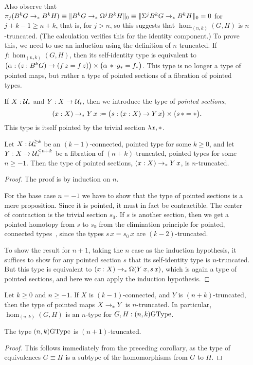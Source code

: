 Also observe that $\pi_j(B^kG \to_\pt B^kH) \equiv
\trunc{0}{B^kG \to_\pt \Omega^jB^kH} \equiv
\trunc{0}{\Sigma^jB^kG \to_\pt B^kH} = 0$ for $j+k-1 \ge n+k$,
that is, for $j>n$, so
this suggests that $\hom_{(n,k)}(G,H)$ is $n$-truncated.
(The calculation verifies this for the identity component.)
To prove
this, we need to use an induction using the definition of
$n$-truncated. If $f:\hom_{(n,k)}(G,H)$, then its self-identity type is
equivalent to $\bigl(\alpha : (z : B^kG) \to (f\,z = f\,z)\bigr) \times
\bigl(\alpha\,\pt \cdot g_\pt = f_\pt\bigr)$. This type is no longer a
type of pointed maps, but rather a type of pointed sections of a
fibration of pointed types.
\begin{defn}
  If $X : \UU_\pt$ and $Y : X \to \UU_\pt$, then we introduce the
  type of \emph{pointed sections},
  \[
    (x : X) \to_\pt Y\,x
    := \bigl(s : (x : X) \to Y\,x\bigr)
    \times \bigl(s\,\pt = \pt\bigr).
  \]
  This type is itself pointed by the trivial section $\lambda x, \pt$.
\end{defn}
\begin{thm}
  Let $X : \UU_\pt^{\ge k}$ be an $(k-1)$-connected, pointed type for
  some $k\ge0$, and
  let $Y : X \to \UU_\pt^{\le n+k}$ be a fibration of
  $(n+k)$-truncated, pointed types for some $n\ge -1$. Then the type
  of pointed sections, $(x : X) \to_\pt Y\,x$, is $n$-truncated.
\end{thm}
\begin{proof}
  The proof is by induction on $n$.

  For the base case $n=-1$ we have to show that the type of pointed
  sections is a mere proposition. Since it is pointed, it must in fact
  be contractible. The center of contraction is the trivial section $s_0$.
  If $s$ is another section, then we get a pointed homotopy from $s$
  to $s_0$ from the elimination principle for pointed, connected
  types~\cite[Lemma~7.5.7]{TheBook}, since the types $s\,x=s_0\,x$ are
  $(k-2)$-truncated.

  To show the result for $n+1$, taking the $n$ case as the induction
  hypothesis, it suffices to show for any pointed section $s$ that its
  self-identity type is $n$-truncated. But this type is equivalent to
  $(x : X) \to_\pt \Omega(Y\,x, s\,x)$, which is again a type of
  pointed sections, and here we can apply the induction hypothesis.
\end{proof}
\begin{cor}
  Let $k\ge0$ and $n\ge-1$. If $X$ is $(k-1)$-connected, and $Y$ is
  $(n+k)$-truncated, then the type of pointed maps $X \to_\pt Y$ is
  $n$-truncated. In particular, $\hom_{(n,k)}(G,H)$ is an $n$-type for
  $G,H:(n,k)\GType$.
\end{cor}
\begin{cor}
  The type $(n,k)\GType$ is $(n+1)$-truncated.
\end{cor}
\begin{proof}
  This follows immediately from the preceding corollary, as the type
  of equivalences $G \equiv H$ is a subtype of the homomorphisms from
  $G$ to $H$.
\end{proof}


